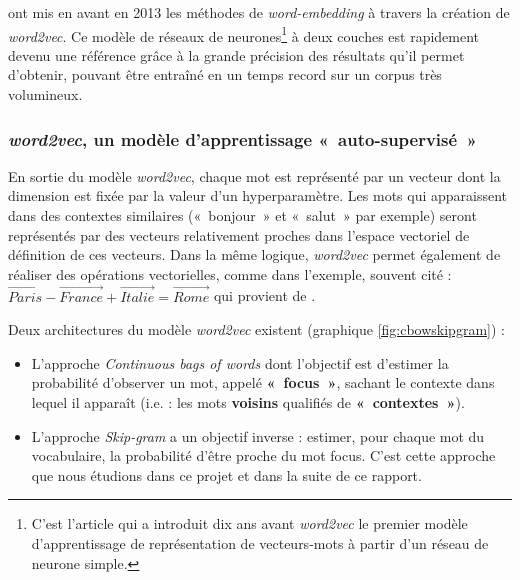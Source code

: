 \documentclass[11pt,french,french]{article}
\let\rmarkdownfootnote\footnote%
\def\footnote{\protect\rmarkdownfootnote}
\begin{document}
\cite{Mikolov} ont mis en avant en 2013 les méthodes de
\emph{word-embedding} à travers la création de \emph{word2vec}. Ce
modèle de réseaux de neurones\footnote{C'est l'article \cite{Bengio} qui
  a introduit dix ans avant \emph{word2vec} le premier modèle
  d'apprentissage de représentation de vecteurs-mots à partir d'un
  réseau de neurone simple.} à deux couches est rapidement devenu une
référence grâce à la grande précision des résultats qu'il permet
d'obtenir, pouvant être entraîné en un temps record sur un corpus très
volumineux.

\subsubsection{\texorpdfstring{\emph{word2vec}, un modèle
d'apprentissage
«~auto-supervisé~»}{word2vec, un modèle d'apprentissage «~auto-supervisé~»}}\label{subsec:word2vec}

En sortie du modèle \emph{word2vec}, chaque mot est représenté par un
vecteur dont la dimension est fixée par la valeur d'un hyperparamètre.
Les mots qui apparaissent dans des contextes similaires («~bonjour~» et
«~salut~» par exemple) seront représentés par des vecteurs relativement
proches dans l'espace vectoriel de définition de ces vecteurs. Dans la
même logique, \emph{word2vec} permet également de réaliser des
opérations vectorielles, comme dans l'exemple, souvent cité :
\(\overrightarrow{Paris} - \overrightarrow{France} + \overrightarrow{Italie} = \overrightarrow{Rome}\)
qui provient de \cite{Mikolov}.

Deux architectures du modèle \emph{word2vec} existent (graphique
\ref{fig:cbowskipgram}) :

\begin{itemize}
\item
  L'approche \emph{Continuous bags of words} dont l'objectif est
  d'estimer la probabilité d'observer un mot, appelé \textbf{«~focus~»},
  sachant le contexte dans lequel il apparaît (i.e. : les mots
  \textbf{voisins} qualifiés de \textbf{«~contextes~»}).
\item
  L'approche \emph{Skip-gram} a un objectif inverse : estimer, pour
  chaque mot du vocabulaire, la probabilité d'être proche du mot focus.
  C'est cette approche que nous étudions dans ce projet et dans la suite
  de ce rapport. 
\end{itemize}
\end{document}
